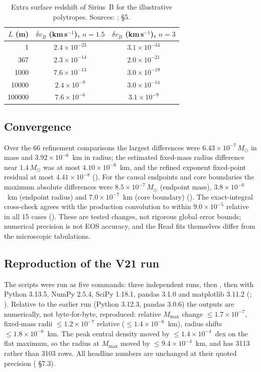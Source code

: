 \documentclass[11pt,a4paper]{article}
\newcommand{\Msun}{M_\odot}
\newcommand{\ee}[2]{#1\times10^{#2}}
\begin{document}
\begin{table}[t]
\centering
\caption[]{Extra surface redshift of Sirius~B for the illustrative polytropes. Sources: ;
 \S5.}
\label{tab:wd}
\begin{tabular}{rcc}
\toprule
$L$ (m) & $\delta v_B$ (km\,s$^{-1}$), $n=1.5$ & $\delta v_B$ (km\,s$^{-1}$), $n=3$\\
\midrule
1 & $\ee{2.4}{-23}$ & $\ee{3.1}{-34}$\\
367 & $\ee{2.3}{-14}$ & $\ee{2.0}{-21}$\\
1000 & $\ee{7.6}{-13}$ & $\ee{3.0}{-19}$\\
10000 & $\ee{2.4}{-9}$ & $\ee{3.0}{-14}$\\
100000 & $\ee{7.6}{-6}$ & $\ee{3.1}{-9}$\\
\bottomrule
\end{tabular}
\end{table}

\subsection{Convergence}\label{sec:conv}
Over the 66 refinement comparisons the largest differences were $\ee{6.43}{-7}\,\Msun$ in mass and
$\ee{3.92}{-6}$~km in radius; the estimated fixed-mass radius difference near $1.4\,\Msun$ was at most
$\ee{4.10}{-6}$~km, and the refined exponent fixed-point residual at most $\ee{4.41}{-8}$
(). For the causal endpoints and core boundaries the maximum absolute differences were
$\ee{8.5}{-7}\,\Msun$ (endpoint mass), $\ee{3.8}{-6}$~km (endpoint radius) and $\ee{7.0}{-7}$~km (core
boundary) (). The exact-integral cross-check agrees with the production
convolution to within $\ee{9.0}{-5}$ relative in all 15 cases (). These are
tested changes, not rigorous global error bounds; numerical precision is not EOS accuracy, and the Read fits
themselves differ from the microscopic tabulations.

\subsection{Reproduction of the V21 run}
The scripts were run as five commands: three independent  runs, then , then
 with Python 3.13.5, NumPy 2.5.4, SciPy 1.18.1, pandas 3.1.0 and matplotlib 3.11.2
(; ). Relative to the earlier run (Python 3.12.3, pandas 3.0.6)
the outputs are numerically, not byte-for-byte, reproduced: relative $M_{\max}$ change $\le\ee{1.7}{-7}$,
fixed-mass radii $\le\ee{1.2}{-7}$ relative ($\le\ee{1.4}{-6}$~km), radius shifts $\le\ee{1.8}{-6}$~km. The peak
central density moved by $\le\ee{1.4}{-4}$~dex on the flat maximum, so the radius at $M_{\max}$ moved by
$\le\ee{9.4}{-4}$~km, and  has 3113 rather than 3103 rows. All headline numbers are
unchanged at their quoted precision ( \S7.3).
\end{document}
